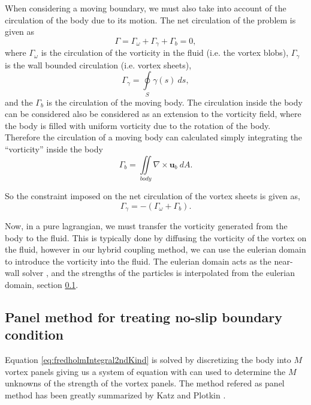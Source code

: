 When considering a moving boundary, we must also take into account of the circulation of the body due to its motion. The net circulation of the problem is given as
	\begin{equation}
	\Gamma = \Gamma_{\omega} + \Gamma_{\gamma} + \Gamma_{b} = 0,
	\end{equation}	
where $\Gamma_{\omega}$ is the circulation of the vorticity in the fluid (i.e. the vortex blobs), $\Gamma_{\gamma}$ is the wall bounded circulation (i.e. vortex sheets),
	\begin{equation}
	\Gamma_{\gamma} = \oint\limits_S\gamma\left(s\right)\ d s,
	\end{equation}	
and the $\Gamma_b$ is the circulation of the moving body. The circulation inside the body can be considered also be considered as an extension to the vorticity field, where the body is filled with uniform vorticity due to the rotation of the body. Therefore the circulation of a moving body can calculated simply integrating the ``vorticity'' inside the body
	\begin{equation}
	\Gamma_b = \iint\limits_{body} \nabla \times \mathbf{u}_b \ d A.
	\end{equation}	

So the constraint imposed on the net circulation of the vortex sheets is given as,
	\begin{equation}
	\Gamma_{\gamma} = - \left(\Gamma_{\omega} + \Gamma_b\right).
	\end{equation}	

Now, in a pure lagrangian, we must transfer the vorticity generated from the body to the fluid. This is typically done by diffusing the vorticity of the vortex on the fluid, however in our hybrid coupling method, we can use the eulerian domain to introduce the vorticity into the fluid. The eulerian domain acts as the near-wall solver \cite{Daeninck2006}, and the strengths of the particles is interpolated from the eulerian domain, section \ref{}.

\subsection{Panel method for treating no-slip boundary condition}
Equation \ref{eq:fredholmIntegral2ndKind} is solved by discretizing the body into $M$ vortex panels giving us a system of equation with can used to determine the $M$ unknowns of the strength of the vortex panels. The method refered as panel method has been greatly summarized by Katz and Plotkin \cite{Katz2001a}. 

